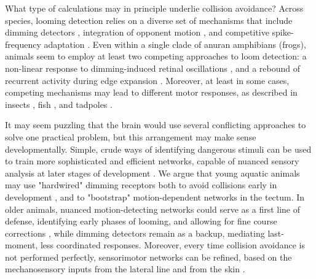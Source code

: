 \documentclass{article}
\begin{document}
What type of calculations may in principle underlie collision avoidance? Across species, looming detection relies on a diverse set of mechanisms that include dimming detectors \citep{ishikane2005, munch2009}, integration of opponent motion \citep{klapoetke2017looming}, and competitive spike-frequency adaptation \citep{peron2009adaptation, fotowat2011multiplexing}. Even within a single clade of anuran amphibians (frogs), animals seem to employ at least two competing approaches to loom detection: a non-linear response to dimming-induced retinal oscillations \citep{baranauskas2012}, and a rebound of recurrent activity during edge expansion \citep{khakhalin2014, jang2016}. Moreover, at least in some cases, competing mechanisms may lead to different motor responses, as described in insects \citep{card2008tradeoffs, chan2013avoidance}, fish \citep{budick2000repertoire, burgess2007twoescapes, portugues2009behaviors, temizer2015pathway, bhattacharyya2017assessment}, and tadpoles \citep{khakhalin2014}.

It may seem puzzling that the brain would use several conflicting approaches to solve one practical problem, but this arrangement may make sense developmentally. Simple, crude ways of identifying dangerous stimuli can be used to train more sophisticated and efficient networks, capable of nuanced sensory analysis at later stages of development \citep{marblestone2016deeplearning,zador2019critique}. We argue that young aquatic animals may use "hardwired" dimming receptors \citep{baranauskas2012} both to avoid collisions early in development \citep{dong2009}, and to "bootstrap" motion-dependent networks in the tectum. In older animals, nuanced motion-detecting networks could serve as a first line of defense, identifying early phases of looming, and allowing for fine course corrections \citep{khakhalin2014, bhattacharyya2017assessment}, while dimming detectors remain as a backup, mediating last-moment, less coordinated responses. Moreover, every time collision avoidance is not performed perfectly, sensorimotor networks can be refined, based on the mechanosensory inputs from the lateral line and from the skin \citep{felch2016, helmbrecht2018topography}.
\end{document}
